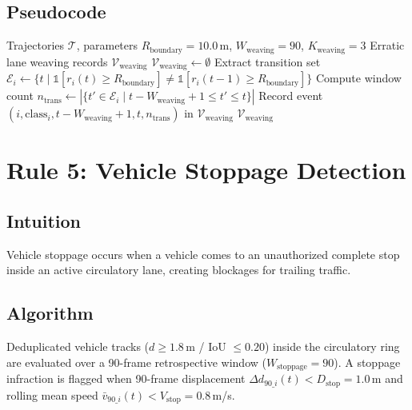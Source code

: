 \subsection{Pseudocode}
\begin{algorithm}[H]
\caption{Erratic Lane Weaving Detection Algorithm}
\label{alg:rule4}
\begin{algorithmic}[1]
\Require Trajectories $\mathcal{T}$, parameters $R_{\text{boundary}} = 10.0$\,m, $W_{\text{weaving}} = 90$, $K_{\text{weaving}} = 3$
\Ensure Erratic lane weaving records $\mathcal{V}_{\text{weaving}}$
\State $\mathcal{V}_{\text{weaving}} \gets \emptyset$
    \State Extract transition set $\mathcal{E}_i \gets \{t \mid \mathbb{1}[r_i(t) \ge R_{\text{boundary}}] \neq \mathbb{1}[r_i(t-1) \ge R_{\text{boundary}}]\}$
        \State Compute window count $n_{\text{trans}} \gets |\{t' \in \mathcal{E}_i \mid t - W_{\text{weaving}} + 1 \le t' \le t\}|$
            \State Record event $(i, \text{class}_i, t - W_{\text{weaving}} + 1, t, n_{\text{trans}})$ in $\mathcal{V}_{\text{weaving}}$
        \EndIf
    \EndFor
\EndFor
\State \Return $\mathcal{V}_{\text{weaving}}$
\end{algorithmic}
\end{algorithm}

\section{Rule 5: Vehicle Stoppage Detection}
\label{sec:rule5}

\subsection{Intuition}
Vehicle stoppage occurs when a vehicle comes to an unauthorized complete stop inside an active circulatory lane, creating blockages for trailing traffic.

\subsection{Algorithm}
Deduplicated vehicle tracks ($d \ge 1.8$\,m / IoU $\le 0.20$) inside the circulatory ring are evaluated over a 90-frame retrospective window ($W_{\text{stoppage}} = 90$). A stoppage infraction is flagged when 90-frame displacement $\Delta d_{90\_i}(t) < D_{\text{stop}} = 1.0$\,m and rolling mean speed $\bar{v}_{90\_i}(t) < V_{\text{stop}} = 0.8$\,m/s.


